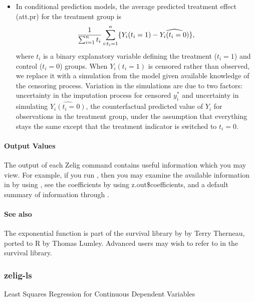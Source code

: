 \documentclass[letterpaper,10pt,english]{sphinxmanual}
\begin{document}
\begin{itemize}
\item {} 
In conditional prediction models, the average predicted treatment
effect (att.pr) for the treatment group is
\begin{gather}
\begin{split}\frac{1}{\sum_{i=1}^n t_i} \sum_{i:t_i=1}^n \{  Y_i(t_i=1) -
\widehat{Y_i(t_i=0)} \},\end{split}\notag
\end{gather}
where \(t_i\) is a binary explanatory variable defining the
treatment (\(t_i=1\)) and control (\(t_i=0\)) groups. When
\(Y_i(t_i=1)\) is censored rather than observed, we replace it
with a simulation from the model given available knowledge of the
censoring process. Variation in the simulations are due to two
factors: uncertainty in the imputation process for censored
\(y_i^*\) and uncertainty in simulating
\(\widehat{Y_i(t_i=0)}\), the counterfactual predicted value of
\(Y_i\) for observations in the treatment group, under the
assumption that everything stays the same except that the treatment
indicator is switched to \(t_i=0\).

\end{itemize}


\paragraph{Output Values}
\label{zelig-lognorm:output-values}
The output of each Zelig command contains useful information which you
may view. For example, if you run
, then you may
examine the available information in  by using
, see the coefficients by using z.out\$coefficients, and
a default summary of information through .


\paragraph{See also}
\label{zelig-lognorm:see-also}
The exponential function is part of the survival library by by Terry
Therneau, ported to R by Thomas Lumley. Advanced users may wish to refer
to  in the survival library.


\subsubsection{zelig-ls}
\label{zelig-ls::doc}\label{zelig-ls:zelig-ls}\label{zelig-ls:zls}
Least Squares Regression for Continuous Dependent Variables
\end{document}
